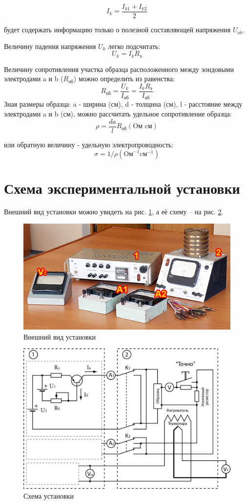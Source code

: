 		$$I_k=\frac{I_{k1}+I_{k2}}{2}$$
		
		будет содержать информацию только о полезной составляющей напряжения $U_{ab}$.
		
		Величину падения напряжения $U_k$ легко подсчитать:
		$$U_{k}=I_{k} R_{\text{э}}$$
		
		Величину сопротивления участка образца расположенного между зондовыми электродами a и b ($R_{\text{об}}$) можно определить из равенства:
		$$R_{\text{об}}=\frac{U_{k}}{I_{\text{об}}}=\frac{I_{k} R_{\text{э}}}{I_{\text{об}}}$$
		Зная размеры образца: a - ширина (см), d - толщина (см), l - расстояние между электродами a и b (см), можно рассчитать удельное сопротивление образца:
		$$\rho=\frac{d a}{l} R_{\text{об}} (\text{Oм} \text{ cм})$$
		
		или обратную величину - удельную электропроводность: 
		$$\sigma=1 / \rho\left(\text{Oм}^{-1} \text{cм}^{-1}\right)$$
		
		\section{Схема экспериментальной установки}
		Внешний вид установки можно увидеть на рис. \ref{fig:6.1}, а её схему – на рис. \ref{fig:6.2}. 
		
		\begin{figure}[h!]
			\centering
			\includegraphics[width = .9\linewidth]{img/ust.jpg}
			\caption{Внешний вид установки}
			\label{fig:6.1}
		\end{figure}
		
		\begin{figure}[h!]
			\centering
			\includegraphics[width = .9\linewidth]{img/scheme-2.jpg}
			\caption{Схема установки}
			\label{fig:6.2}
		\end{figure}
		
